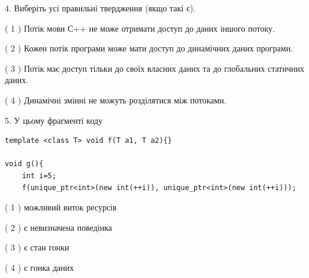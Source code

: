 \documentclass[12pt, ukrainian]{article}
\begin{document}
\begin {large}
{%
4. Виберіть усі правильні твердження (якщо такі є).\par
\vspace{2mm}

( 1 ) Потік мови С++ не може отримати доступ до даних іншого потоку.%

( 2 ) Кожен потік програми може мати доступ до динамічних даних програми.%

( 3 ) Потік має доступ тільки до своїх власних даних та до глобальних статичних даних.%

( 4 ) Динамічні змінні не можуть розділятися між потоками.%


5. У цьому фрагменті коду
\begin{verbatim}
template <class T> void f(T a1, T a2){}

void g(){
    int i=5;
    f(unique_ptr<int>(new int(++i)), unique_ptr<int>(new int(++i)));
\end{verbatim}

( 1 ) можливий виток ресурсів%

( 2 ) є невизначена поведінка%

( 3 ) є стан гонки%

( 4 ) є гонка даних%
}
\end {large}
\end{document}
